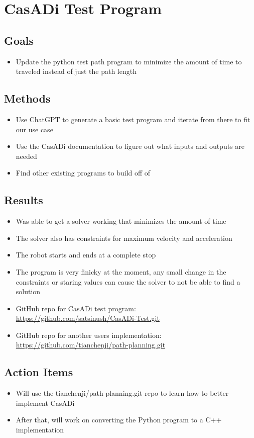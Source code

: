 \section{CasADi Test Program}

\subsection{Goals}
\begin{itemize}
    \item Update the python test path program to minimize the amount of time to traveled instead of just the path length
\end{itemize}

\subsection{Methods}
\begin{itemize}
    \item Use ChatGPT to generate a basic test program and iterate from there to fit our use case
    \item Use the CasADi documentation to figure out what inputs and outputs are needed
    \item Find other existing programs to build off of
\end{itemize}

\subsection{Results}
\begin{itemize}
    \item Was able to get a solver working that minimizes the amount of time
    \item The solver also has constraints for maximum velocity and acceleration
    \item The robot starts and ends at a complete stop
    \item The program is very finicky  at the moment, any small change in the constraints or staring values can cause the solver to not be able to find a solution
    \item GitHub repo for CasADi test program: \href{https://github.com/satsinush/CasADi-Test.git}{https://github.com/satsinush/CasADi-Test.git}
    \item GitHub repo for another users implementation: \href{https://github.com/tianchenji/path-planning.git}{https://github.com/tianchenji/path-planning.git}
\end{itemize}

\subsection{Action Items}
\begin{itemize}
    \item Will use the tianchenji/path-planning.git repo to learn how to better implement CasADi
    \item After that, will work on converting the Python program to a C++ implementation
\end{itemize}
